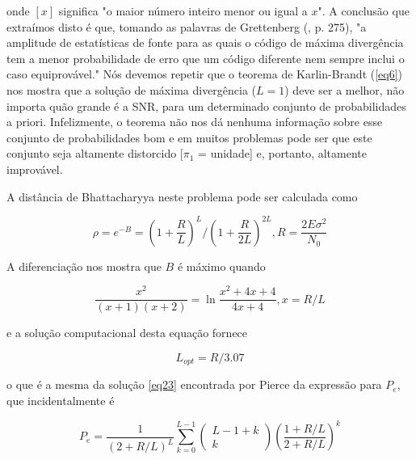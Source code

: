 \documentclass{sbrt2017port}
\begin{document}
onde $[x]$ significa "o maior número inteiro menor ou igual a $x$". A conclusão que extraímos disto é que, tomando as palavras de Grettenberg (\cite{r10}, p. 275), "a amplitude de estatísticas de fonte para as quais o código de máxima divergência tem a menor probabilidade de erro que um código diferente nem sempre inclui o caso equiprovável." Nós devemos repetir que o teorema de Karlin-Brandt (\ref{eq6}) nos mostra que a solução de máxima divergência ($L=1$) deve ser a melhor, não importa quão grande é a SNR, para um determinado conjunto de probabilidades a priori. Infelizmente, o teorema não nos dá nenhuma informação sobre esse conjunto de probabilidades bom e em muitos problemas pode ser que este conjunto seja altamente distorcido [$\pi_1$ = unidade] e, portanto, altamente improvável.

A distância de Bhattacharyya neste problema pode ser calculada como

$$ \rho = e^{-B} = {(1+\frac{R}{L})}^L/{(1+\frac{R}{2L})}^{2L}, R = \frac{2E\sigma^2}{N_0}$$

A diferenciação nos mostra que $B$ é máximo quando

$$ \frac{x^2}{(x+1)(x+2)} = \ln{\frac{x^2 + 4x + 4}{4x + 4}}, x = R/L $$

e a solução computacional desta equação fornece

$$ L_{opt} = R/3.07 $$

o que é a mesma da solução \ref{eq23} encontrada por Pierce \cite{r21} da expressão para $P_e$, que incidentalmente é

$$ P_e = \frac{1}{{(2+R/L)}^L}\sum_{k=0}^{L-1} \left(\begin{array}{c} L-1+k \\ k \end{array} \right){\left(\frac{1+R/L}{2+R/L}\right)}^k $$
\end{document}
